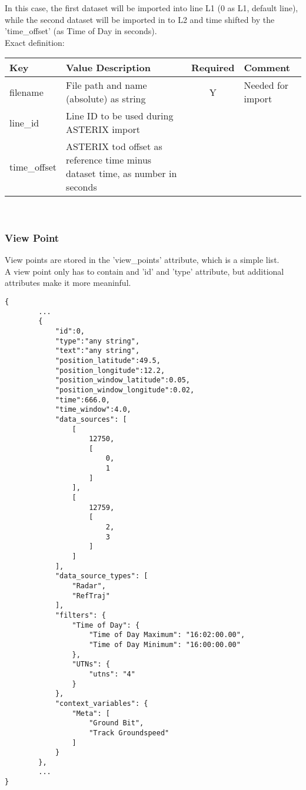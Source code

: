 In this case, the first dataset will be imported into line L1 (0 as L1, default line), while the second dataset will be imported in to L2 and time shifted by the 'time\_offset' (as Time of Day in seconds). \\

Exact definition:

\begin{center}
 \begin{table}[H]
  \begin{tabularx}{\textwidth}{ | l | X | c | X | }
    \hline
    \textbf{Key} & \textbf{Value Description} & \textbf{Required} & \textbf{Comment} \\ \hline
    filename & File path and name (absolute) as string & Y & Needed for import \\ \hline
    line\_id & Line ID to be used during ASTERIX import & & \\ \hline
    time\_offset & ASTERIX tod offset as reference time minus dataset time, as number in seconds & & \\ \hline
\end{tabularx}
\end{table}
\end{center}
\ \\

\subsubsection{View Point}

View points are stored in the 'view\_points' attribute, which is a simple list. \\

A view point only has to contain and 'id' and 'type' attribute, but additional attributes make it more meaninful.

\begin{lstlisting}[basicstyle=\small\ttfamily]
{
        ...
        {
            "id":0,
            "type":"any string",
            "text":"any string",
            "position_latitude":49.5,
            "position_longitude":12.2,
            "position_window_latitude":0.05,
            "position_window_longitude":0.02,
            "time":666.0,
            "time_window":4.0,
            "data_sources": [
                [
                    12750,
                    [
                        0,
                        1
                    ]
                ],
                [
                    12759,
                    [
                        2,
                        3
                    ]
                ]
            ],
            "data_source_types": [
                "Radar",
                "RefTraj"
            ],
            "filters": {
                "Time of Day": {
                    "Time of Day Maximum": "16:02:00.00",
                    "Time of Day Minimum": "16:00:00.00"
                },
                "UTNs": {
                    "utns": "4"
                }
            },
            "context_variables": {
                "Meta": [
                    "Ground Bit",
                    "Track Groundspeed"
                ]
            }
        },
        ...
}
\end{lstlisting}


